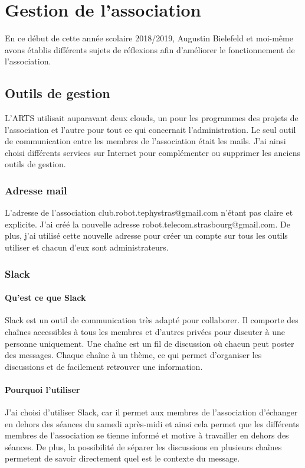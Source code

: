 \documentclass[11pt,a4paper]{report}
\begin{document}
\chapter{Gestion de l'association}
  En ce début de cette année scolaire 2018/2019, Augustin Bielefeld et moi-même avons établis différents sujets de réflexions afin d'améliorer le fonctionnement de l'association.

  \section{Outils de gestion}
    L'ARTS utilisait auparavant deux clouds, un pour les programmes des projets de l'association et l'autre pour tout ce qui concernait l'administration.
    Le seul outil de communication entre les membres de l'association était les mails.
    J'ai ainsi choisi différents services sur Internet pour complémenter ou supprimer les anciens outils de gestion.

    \subsection{Adresse mail}
      L'adresse de l'association club.robot.tephystras@gmail.com n'étant pas claire et explicite. J'ai créé la nouvelle adresse robot.telecom.strasbourg@gmail.com.
      De plus, j'ai utilisé cette nouvelle adresse pour créer un compte sur tous les outils utiliser et chacun d'eux sont administrateurs.

    \subsection{Slack}
      \subsubsection{Qu'est ce que Slack}
        Slack est un outil de communication très adapté pour collaborer. Il comporte des chaînes accessibles à tous les membres et d'autres privées pour discuter à une personne uniquement. Une chaîne est un fil de discussion où chacun peut poster des messages. Chaque chaîne à un thème, ce qui permet d'organiser les discussions et de facilement retrouver une information.

      \subsubsection{Pourquoi l'utiliser}
        J'ai choisi d'utiliser Slack, car il permet aux membres de l'association d'échanger en dehors des séances du samedi après-midi et ainsi cela permet que les différents membres de l'association se tienne informé et motive à travailler en dehors des séances. De plus, la possibilité de séparer les discussions en plusieurs chaînes permetent de savoir directement quel est le contexte du message.
\end{document}
